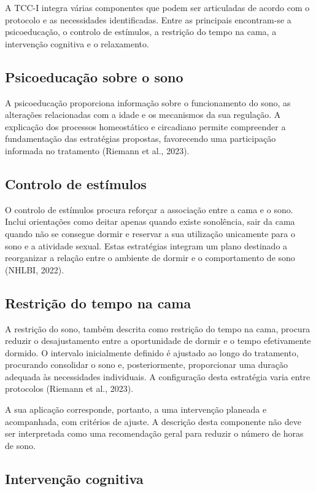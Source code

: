 A TCC-I integra várias componentes que podem ser articuladas de acordo com o protocolo e as necessidades identificadas. Entre as principais encontram-se a psicoeducação, o controlo de estímulos, a restrição do tempo na cama, a intervenção cognitiva e o relaxamento.

\subsection*{Psicoeducação sobre o sono}

A psicoeducação proporciona informação sobre o funcionamento do sono, as alterações relacionadas com a idade e os mecanismos da sua regulação. A explicação dos processos homeostático e circadiano permite compreender a fundamentação das estratégias propostas, favorecendo uma participação informada no tratamento (Riemann et al., 2023).

\subsection*{Controlo de estímulos}

O controlo de estímulos procura reforçar a associação entre a cama e o sono. Inclui orientações como deitar apenas quando existe sonolência, sair da cama quando não se consegue dormir e reservar a sua utilização unicamente para o sono e a atividade sexual. Estas estratégias integram um plano destinado a reorganizar a relação entre o ambiente de dormir e o comportamento de sono (NHLBI, 2022).

\subsection*{Restrição do tempo na cama}

A restrição do sono, também descrita como restrição do tempo na cama, procura reduzir o desajustamento entre a oportunidade de dormir e o tempo efetivamente dormido. O intervalo inicialmente definido é ajustado ao longo do tratamento, procurando consolidar o sono e, posteriormente, proporcionar uma duração adequada às necessidades individuais. A configuração desta estratégia varia entre protocolos (Riemann et al., 2023).

A sua aplicação corresponde, portanto, a uma intervenção planeada e acompanhada, com critérios de ajuste. A descrição desta componente não deve ser interpretada como uma recomendação geral para reduzir o número de horas de sono.

\subsection*{Intervenção cognitiva}

